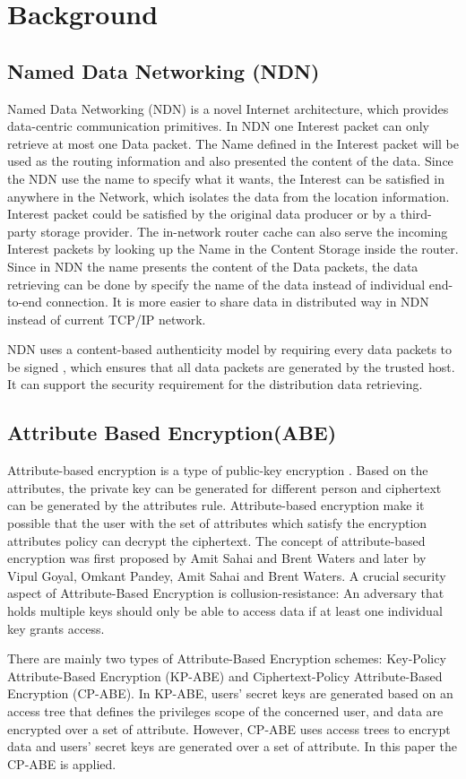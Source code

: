 \section{Background}

\subsection{Named Data Networking (NDN)}
Named Data Networking (NDN) \cite{zhang2014named} is a novel Internet architecture, which provides data-centric communication primitives. In NDN one Interest packet can only retrieve at most one Data packet. The Name defined in the Interest packet will be used as the routing information and also presented the content of the data. Since the NDN use the name to specify what it wants, the Interest can be satisfied in anywhere in the Network, which isolates the data from the location information. Interest packet could be satisfied by the original data producer or by a third-party storage provider. The in-network router cache can also serve the incoming Interest packets by looking up the Name in the Content Storage inside the router. Since in NDN the name presents the content of the Data packets, the data retrieving can be done by specify the name of the data instead of individual end-to-end connection. It is more easier to share data in distributed way in NDN instead of current TCP/IP network.

NDN uses a content-based authenticity model by requiring every data packets to be signed \cite{yu2015name}, which ensures that all data packets are generated by the trusted host. It can support the security requirement for the distribution data retrieving.

\subsection{Attribute Based Encryption(ABE)}
Attribute-based encryption is a type of public-key encryption \cite{brucker2010attribute}. Based on the attributes, the private key can be generated for different person and ciphertext can be generated by the attributes rule. Attribute-based encryption make it possible that the user with the set of attributes which satisfy the encryption attributes policy can decrypt the ciphertext. The concept of attribute-based encryption was first proposed by Amit Sahai and Brent Waters \cite{sahai2005fuzzy} and later by Vipul Goyal, Omkant Pandey, Amit Sahai and Brent Waters\cite{goyal2006attribute}. A crucial security aspect of Attribute-Based Encryption is collusion-resistance: An adversary that holds multiple keys should only be able to access data if at least one individual key grants access.

There are mainly two types of Attribute-Based Encryption schemes: Key-Policy Attribute-Based Encryption (KP-ABE)\cite{goyal2006attribute} and Ciphertext-Policy Attribute-Based Encryption (CP-ABE).\cite{bethencourt2007ciphertext} In KP-ABE, users' secret keys are generated based on an access tree that defines the privileges scope of the concerned user, and data are encrypted over a set of attribute. However, CP-ABE uses access trees to encrypt data and users' secret keys are generated over a set of attribute. In this paper the CP-ABE is applied.
